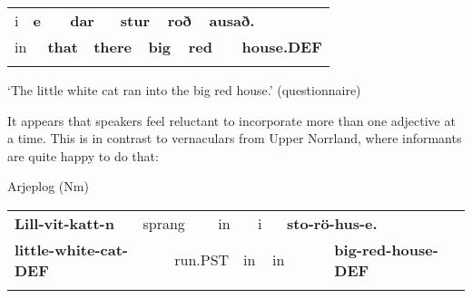 \begin{tabular}{llllllllllll}
\lsptoprule
i & \multicolumn{2}{l}{{\bfseries e}

} & \multicolumn{2}{l}{{\bfseries dar}

} & \multicolumn{2}{l}{{\bfseries stur}

} & \multicolumn{2}{l}{{\bfseries roð}

} & \multicolumn{2}{l}{{\bfseries ausað.}

} & \\
\multicolumn{2}{l}{in

} & \multicolumn{2}{l}{{\bfseries that}

} & \multicolumn{2}{l}{{\bfseries there}

} & \multicolumn{2}{l}{{\bfseries big}

} & \multicolumn{2}{l}{{\bfseries red}

} & \multicolumn{2}{l}{{\bfseries house.DEF}

}\\
\lspbottomrule
\end{tabular}

\begin{styleTranslation}
‘The little white cat ran into the big red house.’ (questionnaire)

\end{styleTranslation}

\begin{styleBodyTextFirst}
It appears that speakers feel reluctant to incorporate more than one adjective at a time. This is in contrast to vernaculars from Upper Norrland, where informants are quite happy to do that:

\end{styleBodyTextFirst}

\begin{listWWNumileveli}
\item 

\begin{styleExample}
Arjeplog (Nm)

\end{styleExample}

\end{listWWNumileveli}

\begin{tabular}{llllllllll}
\lsptoprule
{\bfseries Lill-vit-katt-n} & \multicolumn{2}{l}{sprang

} & \multicolumn{2}{l}{in

} & \multicolumn{2}{l}{i

} & \multicolumn{2}{l}{{\bfseries sto-rö-hus-e.}

} & \\
\multicolumn{2}{l}{{\bfseries little-white-cat-DEF}

} & \multicolumn{2}{l}{run.PST

} & \multicolumn{2}{l}{in

} & \multicolumn{2}{l}{in

} & \multicolumn{2}{l}{{\bfseries big-red-house-DEF}

}\\
\lspbottomrule
\end{tabular}


